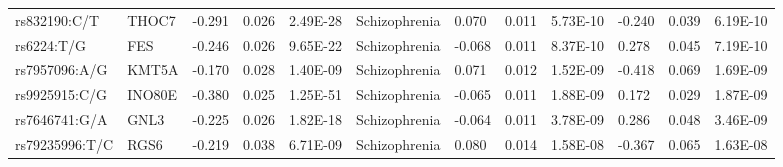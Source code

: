 \begin{table}[]
{\begin{tabular}{llllllllllll}
		\rowcolor[HTML]{BEBEBE}rs832190:C/T                     & THOC7                             & -0.291                            & 0.026                           & 2.49E-28                       & Schizophrenia                              & 0.070                             & 0.011                           & 5.73E-10                       & -0.240                          & 0.039                           & 6.19E-10                       \\
		\rowcolor[HTML]{BEBEBE}rs6224:T/G                       & FES                               & -0.246                            & 0.026                           & 9.65E-22                       & Schizophrenia                              & -0.068                            & 0.011                           & 8.37E-10                       & 0.278                           & 0.045                           & 7.19E-10                       \\
		\rowcolor[HTML]{BEBEBE}rs7957096:A/G                    & KMT5A                             & -0.170                            & 0.028                           & 1.40E-09                       & Schizophrenia                              & 0.071                             & 0.012                           & 1.52E-09                       & -0.418                          & 0.069                           & 1.69E-09                       \\
		\rowcolor[HTML]{BEBEBE}rs9925915:C/G                    & INO80E                            & -0.380                            & 0.025                           & 1.25E-51                       & Schizophrenia                              & -0.065                            & 0.011                           & 1.88E-09                       & 0.172                           & 0.029                           & 1.87E-09                       \\
		\rowcolor[HTML]{BEBEBE}rs7646741:G/A                    & GNL3                              & -0.225                            & 0.026                           & 1.82E-18                       & Schizophrenia                              & -0.064                            & 0.011                           & 3.78E-09                       & 0.286                           & 0.048                           & 3.46E-09                       \\
		\rowcolor[HTML]{BEBEBE}rs79235996:T/C                   & RGS6                              & -0.219                            & 0.038                           & 6.71E-09                       & Schizophrenia                              & 0.080                             & 0.014                           & 1.58E-08                       & -0.367                          & 0.065                           & 1.63E-08                       \\

\end{tabular}}
\end{table}
